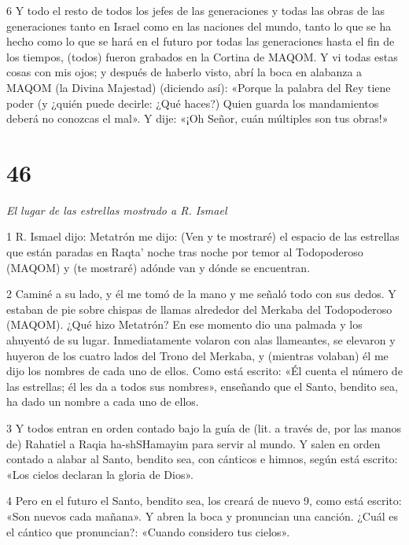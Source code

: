\par 6 Y todo el resto de todos los jefes de las generaciones y todas las obras de las generaciones tanto en Israel como en las naciones del mundo, tanto lo que se ha hecho como lo que se hará en el futuro por todas las generaciones hasta el fin de los tiempos, (todos) fueron grabados en la Cortina de MAQOM. Y vi todas estas cosas con mis ojos; y después de haberlo visto, abrí la boca en alabanza a MAQOM (la Divina Majestad) (diciendo así): «Porque la palabra del Rey tiene poder (y ¿quién puede decirle: ¿Qué haces?) Quien guarda los mandamientos deberá no conozcas el mal». Y dije: «¡Oh Señor, cuán múltiples son tus obras!»



\chapter{46}

\par \textit{El lugar de las estrellas mostrado a R. Ismael}

\par 1 R. Ismael dijo: Metatrón me dijo: (Ven y te mostraré) el espacio de las estrellas que están paradas en Raqta' noche tras noche por temor al Todopoderoso (MAQOM) y (te mostraré) adónde van y dónde se encuentran.

\par 2 Caminé a su lado, y él me tomó de la mano y me señaló todo con sus dedos. Y estaban de pie sobre chispas de llamas alrededor del Merkaba del Todopoderoso (MAQOM). ¿Qué hizo Metatrón? En ese momento dio una palmada y los ahuyentó de su lugar. Inmediatamente volaron con alas llameantes, se elevaron y huyeron de los cuatro lados del Trono del Merkaba, y (mientras volaban) él me dijo los nombres de cada uno de ellos. Como está escrito: «Él cuenta el número de las estrellas; él les da a todos sus nombres», enseñando que el Santo, bendito sea, ha dado un nombre a cada uno de ellos.

\par 3 Y todos entran en orden contado bajo la guía de (lit. a través de, por las manos de) Rahatiel a Raqia ha-shSHamayim para servir al mundo. Y salen en orden contado a alabar al Santo, bendito sea, con cánticos e himnos, según está escrito: «Los cielos declaran la gloria de Dios».

\par 4 Pero en el futuro el Santo, bendito sea, los creará de nuevo 9, como está escrito: «Son nuevos cada mañana». Y abren la boca y pronuncian una canción. ¿Cuál es el cántico que pronuncian?: «Cuando considero tus cielos».

